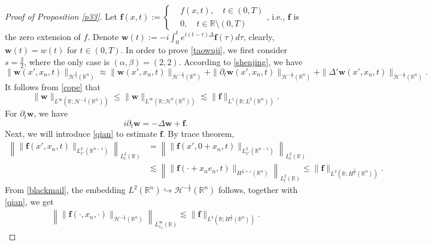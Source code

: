 \documentclass[10pt,a4paper]{amsart}
\begin{document}
\begin{proof}[Proof of Proposition \ref{p33}]
	Let $\boldsymbol{f}(x,t):=\left\{\begin{aligned}&f(x,t), \quad t\in (0,T)\\
		&0, \quad t\in\mathbb{R}\setminus (0,T)\end{aligned}\right.$, i.e., $\boldsymbol{f}$ is the zero extension of $f$. Denote $\boldsymbol{w}(t):=-i \int_{0}^{t}e^{i(t-\tau)\Delta}\boldsymbol{f}(\tau)d\tau$, clearly, $\boldsymbol{w}(t)=w(t)$ for $t\in (0,T)$. In order to prove \eqref{taowuji}, we first consider $s=\frac{3}{2}$, where the only case is $(\alpha,\beta)=(2,2)$. According to \eqref{shenjing}, we have
	{\small\begin{equation}\label{sj} \|\boldsymbol{w}(x',x_{n},t)\|_{\mathcal{H}^{\frac{3}{2}}(\mathbb{R}^{n})}\approx\|\boldsymbol{w}(x',x_{n},t)\|_{\mathcal{H}^{-\frac{1}{2}}(\mathbb{R}^{n})}+\|\partial_{t}\boldsymbol{w}(x',x_{n},t)\|_{\mathcal{H}^{-\frac{1}{2}}(\mathbb{R}^{n})}+\|\Delta'\boldsymbol{w}(x',x_{n},t)\|_{\mathcal{H}^{-\frac{1}{2}}(\mathbb{R}^{n})}.
	\end{equation}}
	It follows from \eqref{cope} that
	\begin{equation}\label{fir} \|\boldsymbol{w}\|_{L^{\infty}(\mathbb{R};\mathcal{H}^{-\frac{1}{2}}(\mathbb{R}^{n}))}\leq \|\boldsymbol{w}\|_{L^{\infty}\left(\mathbb{R};\mathcal{H}^{0}(\mathbb{R}^{n})\right)}\lesssim\|\boldsymbol{f}\|_{L^{1}(\mathbb{R};L^{2}(\mathbb{R}^{n}))}.
	\end{equation}
	For $\partial_{t}\boldsymbol{w}$, we have
	\begin{equation}\label{wf}
		i\partial_{t}\boldsymbol{w}=-\Delta \boldsymbol{w}+\boldsymbol{f}.
	\end{equation}
	Next, we will introduce \eqref{qian} to estimate $\boldsymbol{f}$. By trace theorem,
	\begin{equation} \label{qian}
		\begin{aligned}
			\left \| \|\boldsymbol{f}(x',x_{n},t)\|_{L_{x'}^{2}(\mathbb{R}^{n-1})}  \right\|_{L_{t}^{2}(\mathbb{R})} &= \left \| \|\boldsymbol{f}(x',0+x_{n},t)\|_{L_{x'}^{2}(\mathbb{R}^{n-1})}  \right\|_{L_{t}^{2}(\mathbb{R})}\\&\lesssim   \left\|\|\boldsymbol{f}(\cdot+x_{n}e_{n},t)\|_{H^{\frac{1}{2}+\varepsilon} (\mathbb{R}^{n})}\right\|_{L_{t}^{2}(\mathbb{R})}\leq \|\boldsymbol{f}\|_{L^{2}(\mathbb{R};H^{\frac{3}{2}}(\mathbb{R}^{n}))} .
		\end{aligned}
	\end{equation}
	From \eqref{blackmail}, the embedding   $L^{2}(\mathbb{R}^{n})\hookrightarrow\mathcal{H}^{-\frac{1}{2}}(\mathbb{R}^{n})$ follows, together with \eqref{qian}, we get
	\begin{equation}\label{batter}
		\begin{aligned}	\left\|\|\boldsymbol{f}(\cdot,x_{n},\cdot)\|_{\mathcal{H}^{-\frac{1}{2}}(\mathbb{R}^{n})}\right\|_{L_{x_{n}}^{\infty}(\mathbb{R})}\lesssim\|\boldsymbol{f}\|_{L^{2}(\mathbb{R};H^{\frac{3}{2}}(\mathbb{R}^{n}))}.
		\end{aligned}
	\end{equation}
	

\end{proof}
\end{document}
